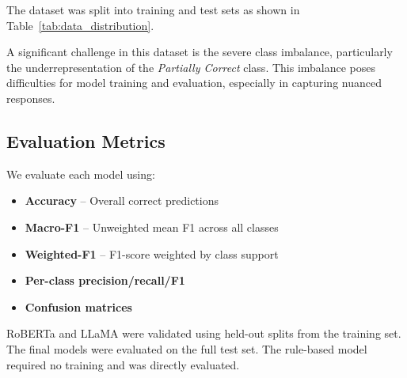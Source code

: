 \documentclass[11pt]{article}
\begin{document}
The dataset was split into training and test sets as shown in Table~\ref{tab:data_distribution}.

\begin{table}[h]
\centering
{}
\caption{Distribution of response types in the training and test sets.}
\label{tab:data_distribution}
\end{table}

A significant challenge in this dataset is the severe class imbalance, particularly the underrepresentation of the \textit{Partially Correct} class. This imbalance poses difficulties for model training and evaluation, especially in capturing nuanced responses.


\subsection{Evaluation Metrics}
We evaluate each model using:
\begin{itemize}
    \item \textbf{Accuracy} – Overall correct predictions
    \item \textbf{Macro-F1} – Unweighted mean F1 across all classes
    \item \textbf{Weighted-F1} – F1-score weighted by class support
    \item \textbf{Per-class precision/recall/F1}
    \item \textbf{Confusion matrices}
\end{itemize}

RoBERTa and LLaMA were validated using held-out splits from the training set. The final models were evaluated on the full test set. The rule-based model required no training and was directly evaluated.
\end{document}
